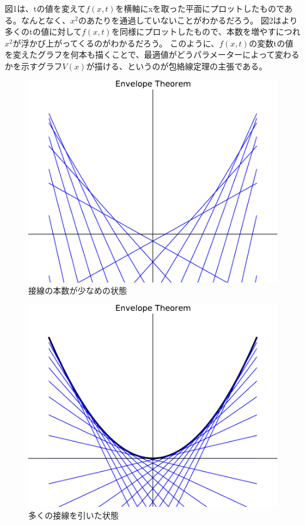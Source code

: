 \documentclass[11pt,a4j,fleqn]{jarticle}
\begin{document}
図1は、tの値を変えて$f(x,t)$を横軸にxを取った平面にプロットしたものである。なんとなく、$x^2$のあたりを通過していないことがわかるだろう。
図2はより多くのtの値に対して$f(x,t)$を同様にプロットしたもので、本数を増やすにつれ$x^2$が浮かび上がってくるのがわかるだろう。
このように、$f(x,t)$の変数tの値を変えたグラフを何本も描くことで、最適値がどうパラメーターによって変わるかを示すグラフ$V(x)$が描ける、というのが包絡線定理の主張である。



\begin{figure}[H]
\begin{center}
\includegraphics[scale=0.5]{envelope1.pdf}
\end{center}
\caption{接線の本数が少なめの状態}
\label{fig:1}
\end{figure}

\begin{figure}[H]
\begin{center}
\includegraphics[scale=0.5]{envelope0.pdf}
\end{center}
\caption{多くの接線を引いた状態}
\label{fig:2}
\end{figure}
\end{document}
